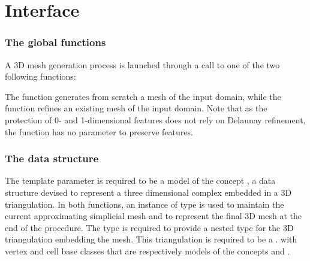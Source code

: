 \section{Interface}
\label{Mesh_3_section_interface}

\subsubsection{The global functions}
A 3D mesh generation  process is launched through a call
 to   one of the two following functions:
 
             



The function  generates from scratch a mesh
of the input domain, while
the function  refines
an existing mesh of the input domain. Note that as the protection
of 0- and 1-dimensional features does not rely on Delaunay 
refinement, the function  has no parameter
to preserve features.


\subsubsection{The data structure}
The template parameter  is required to be a model of
the concept 
, a data structure devised to
represent a three dimensional complex embedded in a 3D
triangulation. In both functions,  an instance  of type  is used to maintain the current
approximating simplicial mesh 
and to represent the final  3D mesh at the end
of the procedure.
The type  is   required to provide a nested type
 for the 3D triangulation
embedding the mesh. 
This triangulation is required to be a .
with  vertex and cell base classes  that are    respectively  models of the
concepts  and .

